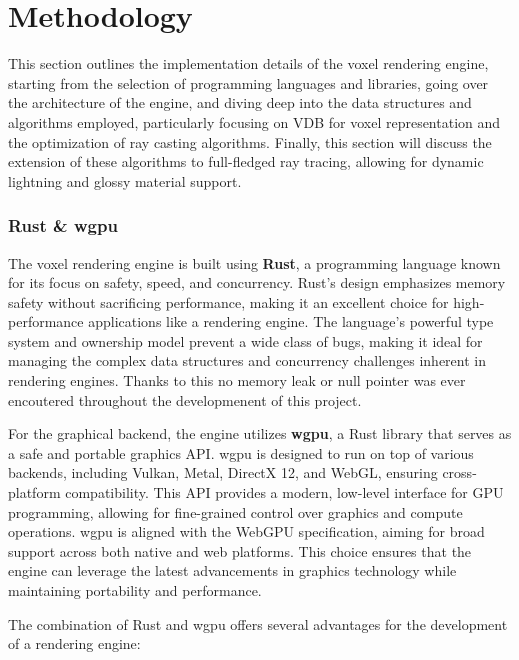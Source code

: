 
\part{Methodology}
This section outlines the implementation details of the voxel rendering engine, starting from the selection of programming languages and libraries, going over the architecture of the engine, and diving deep into the data structures and algorithms employed, particularly focusing on VDB for voxel representation and the optimization of ray casting algorithms.
Finally, this section will discuss the extension of these algorithms to full-fledged ray tracing, allowing for dynamic lightning and glossy material support.

\section{Rust \& wgpu}

The voxel rendering engine is built using \textbf{Rust}, a programming language known for its focus on safety, speed, and concurrency\supercite{rustbook}.
Rust's design emphasizes memory safety without sacrificing performance, making it an excellent choice for high-performance applications like a rendering engine.
The language's powerful type system and ownership model prevent a wide class of bugs, making it ideal for managing the complex data structures and concurrency challenges inherent in rendering engines. Thanks to this no memory leak or null pointer was ever encoutered throughout the developmenent of this project.

For the graphical backend, the engine utilizes \textbf{wgpu}\supercite{wgpu:doc}, a Rust library that serves as a safe and portable graphics API. wgpu is designed to run on top of various backends, including Vulkan, Metal, DirectX 12, and WebGL, ensuring cross-platform compatibility. This API provides a modern, low-level interface for GPU programming, allowing for fine-grained control over graphics and compute operations. wgpu is aligned with the WebGPU specification\supercite{webgpu:doc}, aiming for broad support across both native and web platforms.
This choice ensures that the engine can leverage the latest advancements in graphics technology while maintaining portability and performance.

The combination of Rust and wgpu offers several advantages for the development of a rendering engine:


